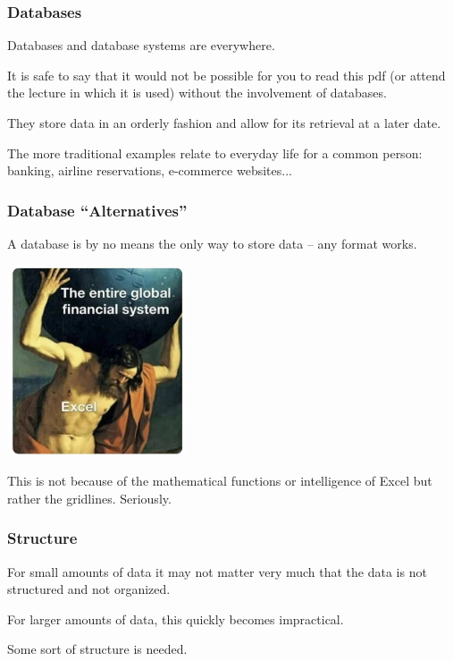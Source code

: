 \begin{frame}
\frametitle{Databases}

Databases and database systems are everywhere. 

It is safe to say that it would not be possible for you to read this pdf (or attend the lecture in which it is used) without the involvement of databases.

They store data in an orderly fashion and allow for its retrieval at a later date.

The more traditional examples relate to everyday life for a common person: banking, airline reservations, e-commerce websites...

\end{frame}



\begin{frame}
\frametitle{Database ``Alternatives''}
A database is by no means the only way to store data -- any format works.


\begin{center}
	\includegraphics[width=0.4\textwidth]{images/excel.jpg}
\end{center}

This is not because of the mathematical functions or intelligence of Excel but rather the gridlines. Seriously.

\end{frame}



\begin{frame}
\frametitle{Structure}

For small amounts of data it may not matter very much that the data is not structured and not organized. 

For larger amounts of data, this quickly becomes impractical. 

Some sort of structure is needed. 

\end{frame}

